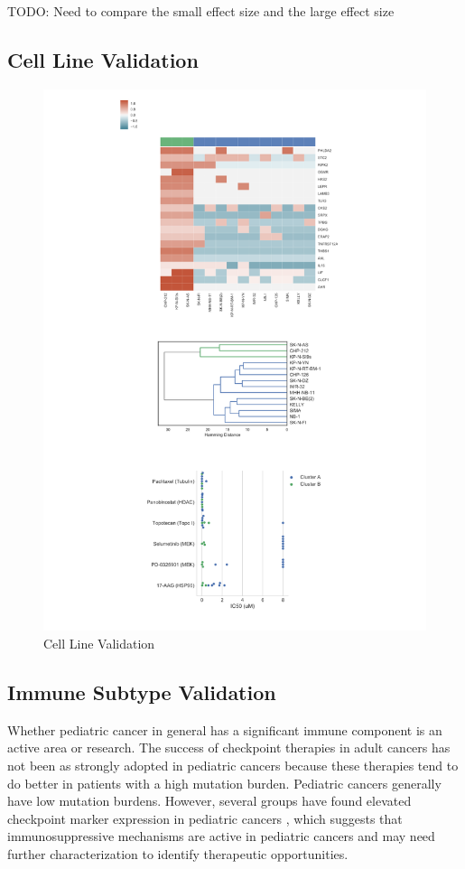 \documentclass[fleqn,10pt]{wlscirep}
\begin{document}
 


TODO: Need to compare the small effect size and the large effect size 

\subsection{Cell Line Validation}
\begin{figure}
	\centering
	\includegraphics[width=0.75\linewidth]{images/rough-cell-line-validation.png}
	\caption{Cell Line Validation}
	\label{sfig:cellline}
\end{figure}

\subsection*{Immune Subtype Validation}
Whether pediatric cancer in general has a significant immune component is an active area or research. The success of checkpoint therapies in adult cancers has not been as strongly adopted in pediatric cancers because these therapies tend to do better in patients with a high mutation burden. Pediatric cancers generally have low mutation burdens. However, several groups have found elevated checkpoint marker expression in pediatric cancers \cite{majzner2017assessment,saletta2017programmed,nowicki2016prospective}, which suggests that immunosuppressive mechanisms are active in pediatric cancers and may need further characterization to identify therapeutic opportunities. 
\end{document}
